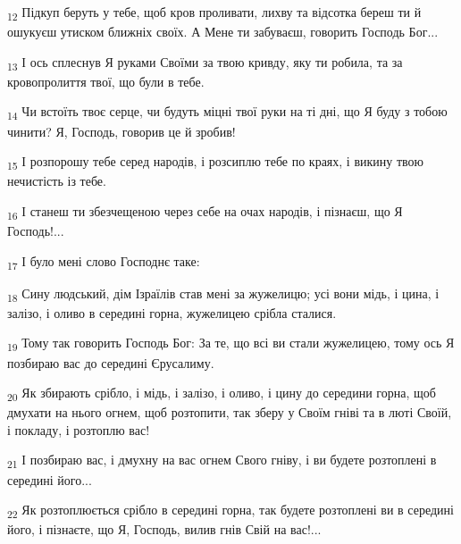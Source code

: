 \begin{tcolorbox}
\textsubscript{12} Підкуп беруть у тебе, щоб кров проливати, лихву та відсотка береш ти й ошукуєш утиском ближніх своїх. А Мене ти забуваєш, говорить Господь Бог...
\end{tcolorbox}
\begin{tcolorbox}
\textsubscript{13} І ось сплеснув Я руками Своїми за твою кривду, яку ти робила, та за кровопролиття твої, що були в тебе.
\end{tcolorbox}
\begin{tcolorbox}
\textsubscript{14} Чи встоїть твоє серце, чи будуть міцні твої руки на ті дні, що Я буду з тобою чинити? Я, Господь, говорив це й зробив!
\end{tcolorbox}
\begin{tcolorbox}
\textsubscript{15} І розпорошу тебе серед народів, і розсиплю тебе по краях, і викину твою нечистість із тебе.
\end{tcolorbox}
\begin{tcolorbox}
\textsubscript{16} І станеш ти збезчещеною через себе на очах народів, і пізнаєш, що Я Господь!...
\end{tcolorbox}
\begin{tcolorbox}
\textsubscript{17} І було мені слово Господнє таке:
\end{tcolorbox}
\begin{tcolorbox}
\textsubscript{18} Сину людський, дім Ізраїлів став мені за жужелицю; усі вони мідь, і цина, і залізо, і оливо в середині горна, жужелицею срібла сталися.
\end{tcolorbox}
\begin{tcolorbox}
\textsubscript{19} Тому так говорить Господь Бог: За те, що всі ви стали жужелицею, тому ось Я позбираю вас до середині Єрусалиму.
\end{tcolorbox}
\begin{tcolorbox}
\textsubscript{20} Як збирають срібло, і мідь, і залізо, і оливо, і цину до середини горна, щоб дмухати на нього огнем, щоб розтопити, так зберу у Своїм гніві та в люті Своїй, і покладу, і розтоплю вас!
\end{tcolorbox}
\begin{tcolorbox}
\textsubscript{21} І позбираю вас, і дмухну на вас огнем Свого гніву, і ви будете розтоплені в середині його...
\end{tcolorbox}
\begin{tcolorbox}
\textsubscript{22} Як розтоплюється срібло в середині горна, так будете розтоплені ви в середині його, і пізнаєте, що Я, Господь, вилив гнів Свій на вас!...
\end{tcolorbox}
